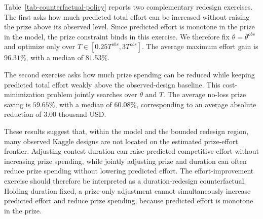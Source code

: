 \documentclass[mnsc]{informs3}
\begin{document}
Table~\ref{tab-counterfactual-policy} reports two complementary redesign
exercises. The first asks how much predicted total effort can be increased
without raising the prize above its observed level. Since predicted effort is
monotone in the prize in the model, the prize constraint binds in this exercise.
We therefore fix $\theta=\theta^{obs}$ and optimize only over
$T\in[0.25T^{obs},3T^{obs}]$. The average maximum effort gain is $96.31\%$,
with a median of $81.53\%$.

The second exercise asks how much prize spending can be reduced while keeping
predicted total effort weakly above the observed-design baseline. This
cost-minimization problem jointly searches over $\theta$ and $T$. The average
no-loss prize saving is $59.65\%$, with a median of $60.08\%$, corresponding to
an average absolute reduction of $3.00$ thousand USD.

These results suggest that, within the model and the bounded redesign region,
many observed Kaggle designs are not located on the estimated prize-effort
frontier. Adjusting contest duration can raise predicted competitive effort
without increasing prize spending, while jointly adjusting prize and duration
can often reduce prize spending without lowering predicted effort.
The effort-improvement exercise should therefore be interpreted as a
duration-redesign counterfactual. Holding duration fixed, a prize-only
adjustment cannot simultaneously increase predicted effort and reduce prize
spending, because predicted effort is monotone in the prize.
\end{document}
